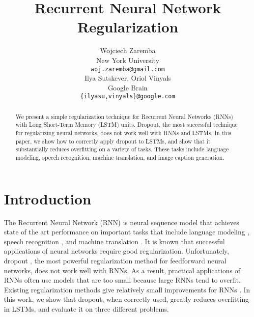 \documentclass{article}
\title{Recurrent Neural Network Regularization}
\begin{document}
 



\author{
Wojciech Zaremba \\
New York University\\
\texttt{woj.zaremba@gmail.com} \\
\And
Ilya Sutskever, Oriol Vinyals \\
Google Brain \\
\texttt{\{ilyasu,vinyals\}@google.com} \\
}

\maketitle






\begin{abstract} 
  We present a simple regularization technique for Recurrent Neural
  Networks (RNNs) with Long Short-Term Memory (LSTM) units.  Dropout,
  the most successful technique for regularizing neural networks, does
  not work well with RNNs and LSTMs.  In this paper, we show how to
  correctly apply dropout to LSTMs, and show that it
  substantially reduces overfitting on a variety of tasks. These tasks
  include language modeling, speech recognition, machine
  translation, and image caption generation.
\end{abstract} 

\section{Introduction}

The Recurrent Neural Network (RNN) is neural sequence model that achieves state of the art
performance on important tasks that include language modeling
\cite{mikolov2012statistical}, speech recognition
\cite{graves2013speech}, and machine translation
\cite{kal13}.  It is known that successful applications of
neural networks require good regularization. Unfortunately, dropout
\cite{srivastava2013improving}, the most powerful regularization method
for feedforward neural networks, does not work well with
RNNs. As a result, practical applications of RNNs often
use models that are too small because large RNNs tend to overfit.  
Existing regularization methods give relatively small improvements for
RNNs \cite{graves2013generating}.
In this work, we show that dropout, when correctly used,
greatly reduces overfitting in LSTMs, and evaluate it on three different problems.
\end{document}
